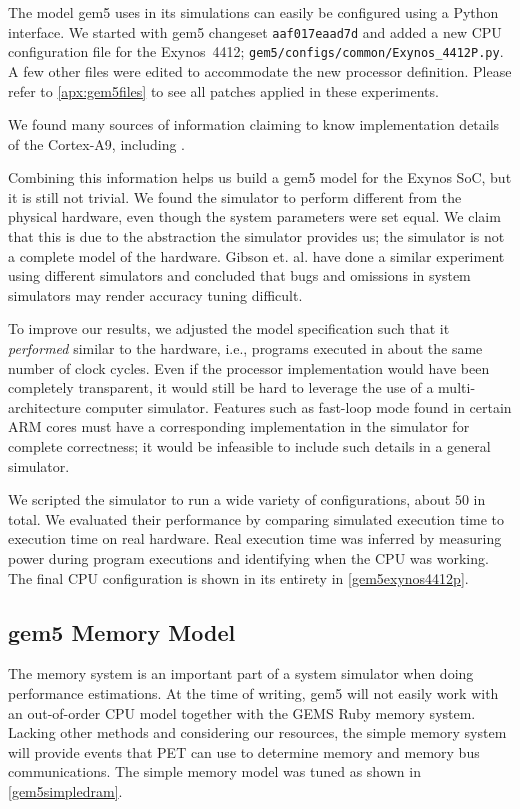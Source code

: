 The model gem5 uses in its simulations can easily be configured using a Python
interface. We started with gem5 changeset \texttt{aaf017eaad7d} and added a new
CPU configuration file for the Exynos~4412;
\texttt{gem5/configs/common/Exynos\_4412P.py}. A few other files were edited to
accommodate the new processor definition. Please refer to
\autoref{apx:gem5files} to see all patches applied in these experiments.

We found many sources of information claiming to know implementation details of
the Cortex-A9, including
\cite{butko2012accuracy,blem2013detailed,armtech,exynoswiki,odroidwiki,geekland,7cpu,armcortexa9specs}.

Combining this information helps us build a gem5 model for the Exynos SoC, but
it is still not trivial.  We found the simulator to perform different from the
physical hardware, even though the system parameters were set equal. We claim
that this is due to the abstraction the simulator provides us; the simulator is
not a complete model of the hardware. Gibson et. al. \cite{gibson2000flash} have
done a similar experiment using different simulators and concluded that bugs and
omissions in system simulators may render accuracy tuning difficult.

To improve our results, we adjusted the model specification such that it
\textit{performed} similar to the hardware, i.e., programs executed in about the
same number of clock cycles. Even if the processor implementation would have
been completely transparent, it would still be hard to leverage the use of a
multi-architecture computer simulator. Features such as fast-loop mode found in
certain ARM cores must have a corresponding implementation in the simulator for
complete correctness; it would be infeasible to include such details in a
general simulator.

We scripted the simulator to run a wide variety of configurations, about $50$ in
total. We evaluated their performance by comparing simulated execution time to
execution time on real hardware. Real execution time was inferred by measuring
power during program executions and identifying when the CPU was working. The
final CPU configuration is shown in its entirety in \autoref{gem5exynos4412p}.


\subsection{gem5 Memory Model}
The memory system is an important part of a system simulator when doing
performance estimations. At the time of writing, gem5 will not easily work with
an out-of-order CPU model together with the GEMS Ruby memory system. Lacking
other methods and considering our resources, the simple memory system will
provide events that PET can use to determine memory and memory bus
communications. The simple memory model was tuned as shown in
\autoref{gem5simpledram}.
